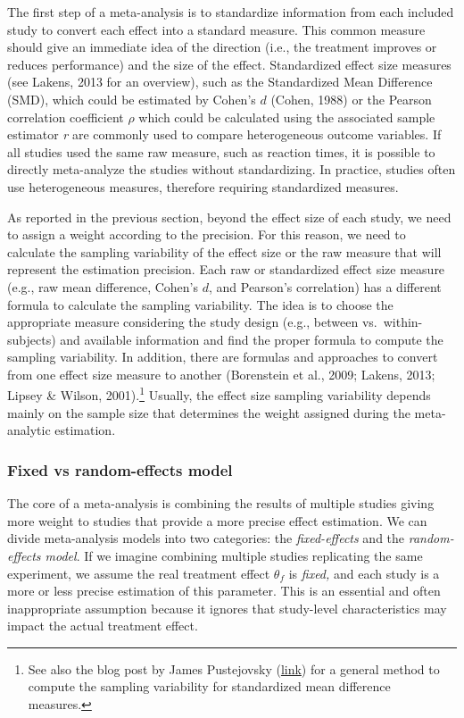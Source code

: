 \documentclass[
  man,floatsintext]{apa6}
\begin{document}
The first step of a meta-analysis is to standardize information from each included study to convert each effect into a standard measure. This common measure should give an immediate idea of the direction (i.e., the treatment improves or reduces performance) and the size of the effect. Standardized effect size measures (see Lakens, 2013 for an overview), such as the Standardized Mean Difference (SMD), which could be estimated by Cohen's \(d\) (Cohen, 1988) or the Pearson correlation coefficient \(\rho\) which could be calculated using the associated sample estimator \emph{r} are commonly used to compare heterogeneous outcome variables. If all studies used the same raw measure, such as reaction times, it is possible to directly meta-analyze the studies without standardizing. In practice, studies often use heterogeneous measures, therefore requiring standardized measures.

As reported in the previous section, beyond the effect size of each study, we need to assign a weight according to the precision. For this reason, we need to calculate the sampling variability of the effect size or the raw measure that will represent the estimation precision. Each raw or standardized effect size measure (e.g., raw mean difference, Cohen's \(d\), and Pearson's correlation) has a different formula to calculate the sampling variability. The idea is to choose the appropriate measure considering the study design (e.g., between vs.~within-subjects) and available information and find the proper formula to compute the sampling variability. In addition, there are formulas and approaches to convert from one effect size measure to another (Borenstein et al., 2009; Lakens, 2013; Lipsey \& Wilson, 2001).\footnote{See also the blog post by James Pustejovsky (\href{https://www.jepusto.com/alternative-formulas-for-the-smd/}{link}) for a general method to compute the sampling variability for standardized mean difference measures.} Usually, the effect size sampling variability depends mainly on the sample size that determines the weight assigned during the meta-analytic estimation.

\hypertarget{fixed-vs-random-effects-model}{%
\subsubsection{Fixed vs random-effects model}\label{fixed-vs-random-effects-model}}

The core of a meta-analysis is combining the results of multiple studies giving more weight to studies that provide a more precise effect estimation. We can divide meta-analysis models into two categories: the \emph{fixed-effects} and the \emph{random-effects model}. If we imagine combining multiple studies replicating the same experiment, we assume the real treatment effect \(\theta_{f}\) is \emph{fixed,} and each study is a more or less precise estimation of this parameter. This is an essential and often inappropriate assumption because it ignores that study-level characteristics may impact the actual treatment effect.
\end{document}
